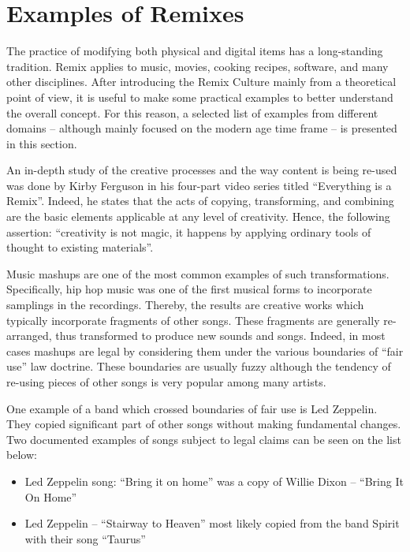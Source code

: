 \section{Examples of Remixes}
\label{sec:RmxExamples}


The practice of modifying both physical and digital items has a long-standing tradition. Remix applies to music, movies, cooking recipes, software, and many other disciplines. After introducing the Remix Culture mainly from a theoretical point of view, it is useful to make some practical examples to better understand the overall concept. For this reason, a selected list of examples from different domains – although mainly focused on the modern age time frame – is presented in this section.

An in-depth study of the creative processes and the way content is being re-used was done by Kirby Ferguson in his four-part video series titled “Everything is a Remix”. Indeed, he states that the acts of copying, transforming, and combining are the basic elements applicable at any level of creativity. Hence, the following assertion: “creativity is not magic, it happens by applying ordinary tools of thought to existing materials”.

Music mashups are one of the most common examples of such transformations. Specifically, hip hop music was one of the first musical forms to incorporate samplings in the recordings. Thereby, the results are creative works which typically incorporate fragments of other songs. These fragments are generally re-arranged, thus transformed to produce new sounds and songs. Indeed, in most cases mashups are legal by considering them under the various boundaries of “fair use” law doctrine. These boundaries are usually fuzzy although the tendency of re-using pieces of other songs is very popular among many artists.

One example of a band which crossed boundaries of fair use is Led Zeppelin. They copied significant part of other songs without making fundamental changes. Two documented examples of songs subject to legal claims can be seen on the list below:

\begin{itemize}
\item Led Zeppelin song: “Bring it on home” was a copy of Willie Dixon – “Bring It On Home”
\item Led Zeppelin – “Stairway to Heaven” most likely copied from the band Spirit with their song “Taurus”
\end{itemize}

